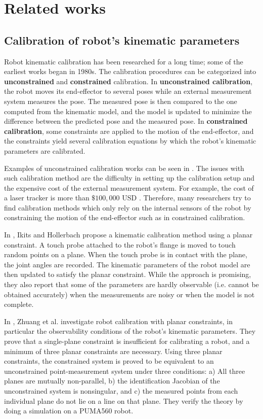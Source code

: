 \section{Related works}
\label{sec:related}
\subsection{Calibration of robot's kinematic parameters}
\label{sec:kine_calib}



Robot kinematic calibration has been researched for a long time; some of the earliest works began in 1980s. The calibration procedures can be categorized into \textbf{unconstrained} and \textbf{constrained} calibration. In \textbf{unconstrained calibration}, the robot moves its end-effector to several poses while an external measurement system measures the pose. The measured pose is then compared to the one computed from the kinematic model, and the model is updated to minimize the difference between the predicted pose and the measured pose. In \textbf{constrained calibration}, some constraints are applied to the motion of the end-effector, and the constraints yield several calibration equations by which the robot's kinematic parameters are calibrated. 


Examples of unconstrained calibration works can be seen in . The issues with such calibration method are the difficulty in setting up the calibration setup and the expensive cost of the external measurement system. For example, the cost of a laser tracker is more than $\$100,000$ USD \cite{Nubiola2013}. Therefore, many researchers try to find calibration methods which only rely on the internal sensors of the robot by constraining the motion of the end-effector such as in constrained calibration. 

In \cite{Ikits1997}, Ikits and Hollerbach propose a kinematic calibration method using a planar constraint. A touch probe attached to the robot's flange is moved to touch random points on a plane. When the touch probe is in contact with the plane, the joint angles are recorded. The kinematic parameters of the robot model are then updated to satisfy the planar constraint. While the approach is promising, they also report that some of the parameters are hardly observable (i.e. cannot be obtained accurately) when the measurements are noisy or when the model is not complete. 

In \cite{Zhuang1999}, Zhuang et al. investigate robot calibration with planar constraints, in particular the observability conditions of the robot's kinematic parameters. They prove that a single-plane constraint is insufficient for calibrating a robot, and a minimum of three planar constraints are necessary. Using three planar constraints, the constrained system is proved to be equivalent to an unconstrained point-measurement system under three conditions: a) All three planes are mutually non-parallel, b) the identification Jacobian of the unconstrained system is nonsingular, and c) the measured points from each individual plane do not lie on a line on that plane. They verify the theory by doing a simulation on a PUMA560 robot. 

